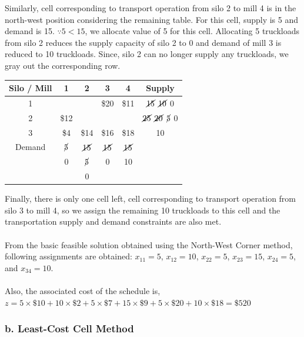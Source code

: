Similarly, cell corresponding to transport operation from silo 2 to mill 4 is in the north-west position considering the remaining table.  For this cell, supply is 5 and demand is 15. $\because 5 < 15$, we allocate value of 5 for this cell. Allocating 5 truckloads from silo 2 reduces the supply capacity of silo 2 to 0 and demand of mill 3 is reduced to 10 truckloads. Since, silo 2 can no longer supply any truckloads, we gray out the corresponding row.
\begin{center}
	\begin{tabular}{c | c | c | c | c | c}
		Silo / Mill & 1 & 2 & 3 & 4 & \textbf{Supply}\\ 
		\hline
		1 & \innerbox{\$10}{5} \cellcolor[gray]{0.8} & \innerbox{\$2}{10} \cellcolor[gray]{0.8} & \$20 \cellcolor[gray]{0.8} & \$11 \cellcolor[gray]{0.8} & $ \cancel{15} $ $ \cancel{10} $ 0\\
		\hline
		2 & \$12 \cellcolor[gray]{0.8} & \innerbox{\$7}{5} \cellcolor[gray]{0.8} & \innerbox{\$9}{15} \cellcolor[gray]{0.8} & \innerbox{\$20}{5} \cellcolor[gray]{0.8} & $ \cancel{25} $ $ \cancel{20} $ $ \cancel{5} $ 0\\
		\hline
		3 & \$4 \cellcolor[gray]{0.8} & \$14 \cellcolor[gray]{0.8} & \$16 \cellcolor[gray]{0.8} & \$18 & 10\\
		\hline
		Demand & $ \cancel{5} $ & $ \cancel{15} $ & $ \cancel{15} $ & $ \cancel{15} $ & \\
		& 0 & $ \cancel{5}$ & 0 & 10 & \\ 
		&  & 0 & & & \\
	\end{tabular}
\end{center}
Finally, there is only one cell left, cell corresponding to transport operation from silo 3 to mill 4, so we assign the remaining 10 truckloads to this cell and the transportation supply and demand constraints are also met.\\\\
From the basic feasible solution obtained using the North-West Corner method, following assignments are obtained: $ x_{11} = 5$, $ x_{12} = 10$, $ x_{22} = 5$, $ x_{23} = 15$, $ x_{24} = 5$, and $ x_{34} = 10$.\\\\
Also, the associated cost of the schedule is,\\
$ z = 5 \times \$10 + 10 \times \$2 + 5 \times \$7 + 15 \times \$9 + 5 \times \$20 + 10 \times \$18 = \$520$
\subsubsection{b. Least-Cost Cell Method}